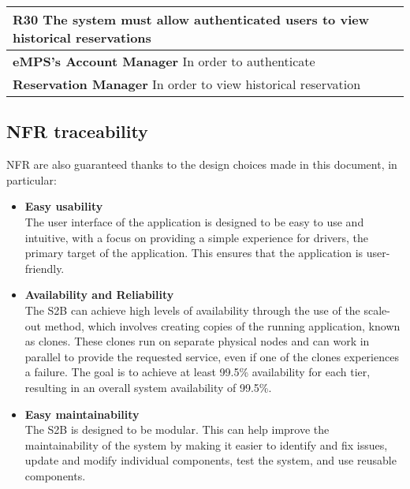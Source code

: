 \begin{table}[H]
    \begin{tabularx}{\textwidth}{X}
        \toprule
        \textbf{R30} The system must allow authenticated users to view historical reservations \\ \midrule
        \textbf{eMPS's Account Manager} In order to authenticate                               \\
        \textbf{Reservation Manager} In order to view historical reservation                   \\
    \end{tabularx}
\end{table}

\subsection*{NFR traceability}
NFR are also guaranteed thanks to the design choices made in this document, in particular:
\begin{itemize}
\item \textbf{Easy usability}\\
The user interface of the application is designed to be easy to use and intuitive, with a focus on providing a simple experience for drivers, the primary target of the application. This ensures that the application is user-friendly.
\item \textbf{Availability and Reliability}\\
The S2B can achieve high levels of availability through the use of the scale-out method, which involves creating copies of the running application, known as clones. These clones run on separate physical nodes and can work in parallel to provide the requested service, even if one of the clones experiences a failure. The goal is to achieve at least 99.5\% availability for each tier, resulting in an overall system availability of 99.5\%.
\item \textbf{Easy maintainability}\\
The S2B is designed to be modular. This can help improve the maintainability of the system by making it easier to identify and fix issues, update and modify individual components, test the system, and use reusable components.
\end{itemize}
